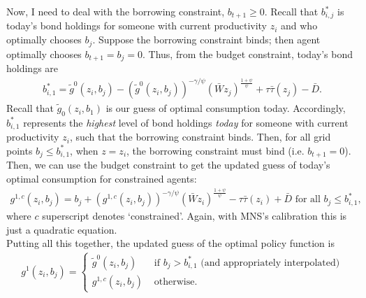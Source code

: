 \documentclass[12pt]{article}
\begin{document}
Now, I need to deal with the borrowing constraint, $b_{t+1} \geq 0$. Recall that $b^*_{i,j}$ is today's bond holdings for someone with current productivity $z_i$ and who optimally chooses $b_j$. Suppose the borrowing constraint binds;  then agent optimally chooses $b_{t+1} = b_j =0$. Thus, from the budget constraint, today's bond holdings are
\begin{align*}
b^*_{i,1} = \tilde g^0(z_i,b_j) - \left(\tilde g^0(z_i,b_j)\right)^{-\gamma/\psi} (\bar Wz_j)^{\frac{1+\psi}{\psi}} + \tau\bar\tau(z_j) - \bar D.
\end{align*}
Recall that $\tilde g_0(z_i,b_1)$ is our guess of optimal consumption today. Accordingly, $b^*_{i,1}$ represents the \textit{highest} level of bond holdings \textit{today} for someone with current productivity $z_i$, such that the borrowing constraint binds. Then, for all grid points $b_j \leq b^*_{i,1}$, when $z=z_i$, the borrowing constraint must bind (i.e. $b_{t+1}=0$). Then, we can use the budget constraint to get the updated guess of today's optimal consumption for constrained agents:
\begin{align*}
g^{1,c}(z_i,b_j) = b_j + \left(g^{1,c}(z_i,b_j)\right)^{-\gamma/\psi} (\bar Wz_i)^{\frac{1+\psi}{\psi}} - \tau\bar\tau(z_i) +\bar D \text{ for all } b_j \leq b^*_{i,1},
\end{align*}
where $c$ superscript denotes `constrained'. Again, with MNS's calibration this is just a quadratic equation.\\

Putting all this together, the updated guess of the optimal policy function is
\begin{align*}
g^1(z_i,b_j) = 
\begin{cases}
\tilde g^0(z_i,b_j) &\text{ if } b_j > b^*_{i,1} \text{ (and appropriately interpolated)}\\
g^{1,c}(z_i,b_j)&\text{ otherwise.}
\end{cases}
\end{align*}
\end{document}
